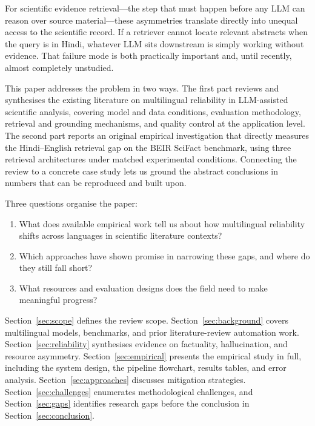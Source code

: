 \documentclass[acmsmall,screen,review]{acmart}
\begin{document}
For scientific evidence retrieval---the step that must happen before any
LLM can reason over source material---these asymmetries translate directly
into unequal access to the scientific record.  If a retriever cannot
locate relevant abstracts when the query is in Hindi, whatever LLM sits
downstream is simply working without evidence.  That failure mode is both
practically important and, until recently, almost completely unstudied.

This paper addresses the problem in two ways.  The first part reviews and
synthesises the existing literature on multilingual reliability in
LLM-assisted scientific analysis, covering model and data conditions,
evaluation methodology, retrieval and grounding mechanisms, and quality
control at the application level.  The second part reports an original
empirical investigation that directly measures the Hindi--English retrieval
gap on the BEIR SciFact benchmark, using three retrieval architectures
under matched experimental conditions.  Connecting the review to a
concrete case study lets us ground the abstract conclusions in numbers
that can be reproduced and built upon.

Three questions organise the paper:
\begin{enumerate}
  \item What does available empirical work tell us about how multilingual
        reliability shifts across languages in scientific literature
        contexts?
  \item Which approaches have shown promise in narrowing these gaps, and
        where do they still fall short?
  \item What resources and evaluation designs does the field need to make
        meaningful progress?
\end{enumerate}

Section~\ref{sec:scope} defines the review scope.
Section~\ref{sec:background} covers multilingual models, benchmarks, and
prior literature-review automation work.
Section~\ref{sec:reliability} synthesises evidence on factuality,
hallucination, and resource asymmetry.
Section~\ref{sec:empirical} presents the empirical study in full, including
the system design, the pipeline flowchart, results tables, and error
analysis.
Section~\ref{sec:approaches} discusses mitigation strategies.
Section~\ref{sec:challenges} enumerates methodological challenges, and
Section~\ref{sec:gaps} identifies research gaps before the conclusion in
Section~\ref{sec:conclusion}.

\end{document}
